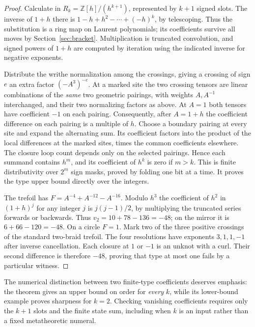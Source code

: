 \begin{proof}
Calculate in $R_k=\mathbb Z[h]/(h^{k+1})$, represented by $k+1$ signed slots. The inverse of $1+h$ there is $1-h+h^2-\cdots+(-h)^k$, by telescoping. Thus the substitution is a ring map on Laurent polynomials; its coefficients survive all moves by Section~\ref{sec:bracket}. Multiplication is truncated convolution, and signed powers of $1+h$ are computed by iteration using the indicated inverse for negative exponents.

Distribute the writhe normalization among the crossings, giving a crossing of sign $e$ an extra factor $(-A^3)^{-e}$. At a marked site the two crossing tensors are linear combinations of the \emph{same} two geometric pairings, with weights $A,A^{-1}$ interchanged, and their two normalizing factors as above. At $A=1$ both tensors have coefficient $-1$ on each pairing. Consequently, after $A=1+h$ the coefficient difference on each pairing is a multiple of $h$. Choose a boundary pairing at every site and expand the alternating sum. Its coefficient factors into the product of the local differences at the marked sites, times the common coefficients elsewhere. The closure loop count depends only on the selected pairings. Hence each summand contains $h^m$, and its coefficient of $h^k$ is zero if $m>k$. This is finite distributivity over $2^m$ sign masks, proved by folding one bit at a time. It proves the type upper bound directly over the integers.

The trefoil has $F=A^{-4}+A^{-12}-A^{-16}$. Modulo $h^3$ the coefficient of $h^2$ in $(1+h)^j$ for any integer $j$ is $j(j-1)/2$, by multiplying the truncated series forwards or backwards. Thus $v_2=10+78-136=-48$; on the mirror it is $6+66-120=-48$. On a circle $F=1$. Mark two of the three positive crossings of the standard two-braid trefoil. The four resolutions have exponents $3,1,1,-1$ after inverse cancellation. Each closure at $1$ or $-1$ is an unknot with a curl. Their second difference is therefore $-48$, proving that type at most one fails by a particular witness.
\end{proof}

The numerical distinction between two finite-type coefficients deserves emphasis: the theorem gives an upper bound on order for \emph{every} $k$, while its lower-bound example proves sharpness for $k=2$. Checking vanishing coefficients requires only the $k+1$ slots and the finite state sum, including when $k$ is an input rather than a fixed metatheoretic numeral.
